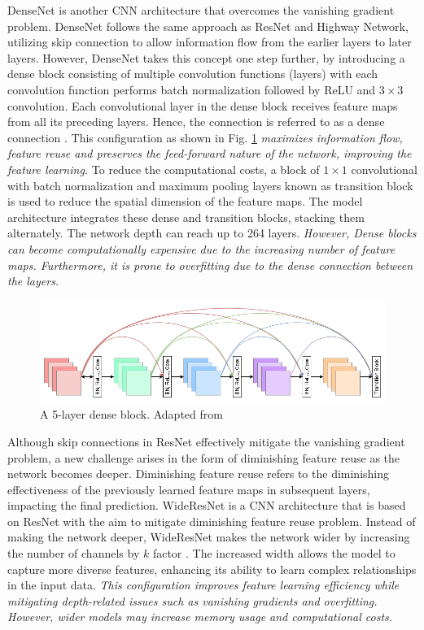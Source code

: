 \documentclass[preprint,12pt]{elsarticle}
\begin{document}
DenseNet is another CNN architecture that overcomes the vanishing gradient problem. DenseNet follows the same approach as ResNet and Highway Network, utilizing skip connection to allow information flow from the earlier layers to later layers. However, DenseNet takes this concept one step further, by introducing a dense block consisting of multiple convolution functions (layers) with each convolution function performs batch normalization followed by ReLU and $3 \times 3$ convolution. Each convolutional layer in the dense block receives feature maps from all its preceding layers. Hence, the connection is referred to as a dense connection \citep{huang_densely_2017}. This configuration as shown in Fig. \ref{fig_deep_sv_learning_cnn_densenet} \emph {maximizes information flow, feature reuse and preserves the feed-forward nature of the network, improving the feature learning.} To reduce the computational costs, a block of $1 \times 1$ convolutional with batch normalization and maximum pooling layers known as transition block is used to reduce the spatial dimension of the feature maps. The model architecture integrates these dense and transition blocks, stacking them alternately. The network depth can reach up to 264 layers. \emph{However, Dense blocks can become computationally expensive due to the increasing number of feature maps. Furthermore, it is prone to overfitting due to the dense connection between the layers.} 

\begin{figure}[h!]
    \centering
    \includegraphics[scale=0.45]{fig_deep_sv_learning_cnn_densenet.png}
    \caption{A 5-layer dense block. Adapted from \citep{huang_densely_2017}}
    \label{fig_deep_sv_learning_cnn_densenet}
\end{figure}

Although skip connections in ResNet effectively mitigate the vanishing gradient problem, a new challenge arises in the form of diminishing feature reuse as the network becomes deeper. Diminishing feature reuse refers to the diminishing effectiveness of the previously learned feature maps in subsequent layers, impacting the final prediction. WideResNet is a CNN architecture that is based on ResNet with the aim to mitigate diminishing feature reuse problem. Instead of making the network deeper, WideResNet makes the network wider by increasing the number of channels by $k$ factor \citep{zagoruyko_wide_2017}. The increased width allows the model to capture more diverse features, enhancing its ability to learn complex relationships in the input data. \emph{This configuration improves feature learning efficiency while mitigating depth-related issues such as vanishing gradients and overfitting. However, wider models may increase memory usage and computational costs.}
\end{document}
